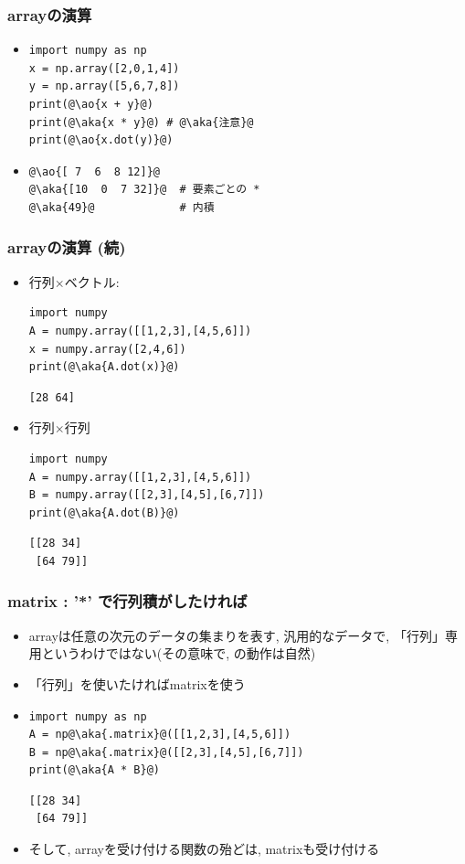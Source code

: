 \documentclass[10pt,dvipdfmx]{beamer}
\newcommand{\ao}[1]{{\color{blue}#1}}
\newcommand{\aka}[1]{{\color{red}#1}}
\begin{document}
\begin{frame}[fragile]
\frametitle{arrayの演算}
\begin{itemize}
\item 
\begin{lstlisting}
import numpy as np
x = np.array([2,0,1,4])
y = np.array([5,6,7,8])
print(@\ao{x + y}@)
print(@\aka{x * y}@) # @\aka{注意}@
print(@\ao{x.dot(y)}@)
\end{lstlisting}
\item 
\begin{lstlisting}
@\ao{[ 7  6  8 12]}@
@\aka{[10  0  7 32]}@  # 要素ごとの *
@\aka{49}@             # 内積
\end{lstlisting}
\end{itemize}
\end{frame}

\begin{frame}[fragile]
\frametitle{arrayの演算 (続)}
\begin{itemize}
\item 行列$\times$ベクトル:
\begin{lstlisting}
import numpy
A = numpy.array([[1,2,3],[4,5,6]])
x = numpy.array([2,4,6])
print(@\aka{A.dot(x)}@)
\end{lstlisting}
\begin{lstlisting}
[28 64]
\end{lstlisting}

\item 行列$\times$行列
\begin{lstlisting}
import numpy
A = numpy.array([[1,2,3],[4,5,6]])
B = numpy.array([[2,3],[4,5],[6,7]])
print(@\aka{A.dot(B)}@)
\end{lstlisting}
\begin{lstlisting}
[[28 34]
 [64 79]]
\end{lstlisting}
\end{itemize}
\end{frame}

\begin{frame}[fragile]
\frametitle{matrix : '*' で行列積がしたければ}
\begin{itemize}
\item arrayは任意の次元のデータの集まりを表す, 汎用的なデータで,
「行列」専用というわけではない(その意味で, {\tt *}の動作は自然)
\item 「行列」を使いたければmatrixを使う
\item 
\begin{lstlisting}
import numpy as np
A = np@\aka{.matrix}@([[1,2,3],[4,5,6]])
B = np@\aka{.matrix}@([[2,3],[4,5],[6,7]])
print(@\aka{A * B}@)
\end{lstlisting}
\begin{lstlisting}
[[28 34]
 [64 79]]
\end{lstlisting}

\item そして, arrayを受け付ける関数の殆どは,
matrixも受け付ける
\end{itemize}
\end{frame}
\end{document}
